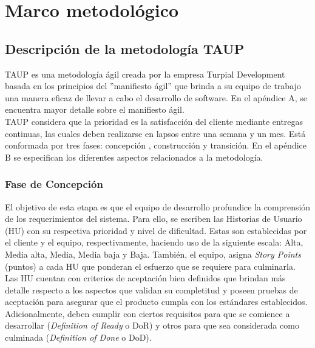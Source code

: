 \chapter{\textbf{Marco metodológico}}

\thispagestyle{empty}

\section{Descripción de la metodología TAUP}

TAUP es una metodología ágil creada por la empresa Turpial Development basada en los principios del ”manifiesto ágil” que brinda a su equipo de trabajo una manera eficaz de llevar a cabo el desarrollo de software. En el apéndice A, se encuentra mayor detalle sobre el manifiesto ágil. \\

TAUP considera que la prioridad es la satisfacción del cliente mediante entregas continuas, las cuales deben realizarse en lapsos entre una semana y un mes. Está conformada por tres fases: concepción , construcción y transición. En el apéndice B se especifican los diferentes aspectos relacionados a la metodología.

\subsection{Fase de Concepción}

El objetivo de esta etapa es que el equipo de desarrollo profundice la comprensión de los requerimientos del sistema. Para ello, se escriben las Historias de Usuario (HU) con su respectiva prioridad y nivel de dificultad. Estas son establecidas por el cliente y el equipo, respectivamente, haciendo uso de la siguiente escala: Alta, Media alta, Media, Media baja y Baja. También, el equipo, asigna \textit{Story Points} (puntos) a cada HU que ponderan el esfuerzo que se requiere para culminarla.\\

Las HU cuentan con criterios de aceptación bien definidos que brindan más detalle respecto a los aspectos que validan su completitud y poseen pruebas de aceptación para asegurar que el producto cumpla con los estándares establecidos. Adicionalmente, deben cumplir con ciertos requisitos para que se comience a desarrollar (\textit{Definition of Ready} o DoR) y otros para que sea considerada como culminada (\textit{Definition of Done} o DoD).\\

